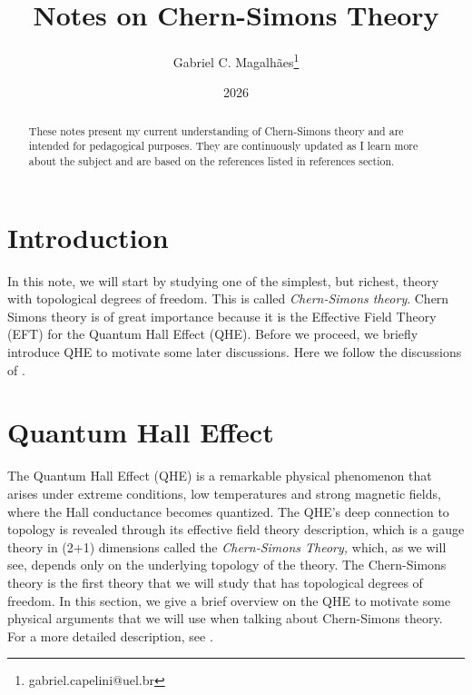 \documentclass{article}
\title{Notes on Chern-Simons Theory}
\author{Gabriel C. Magalhães\footnote{gabriel.capelini@uel.br}}
\date{2026}
\begin{document}
\maketitle

\begin{abstract}
	These notes present  my current understanding of Chern-Simons theory and are intended for pedagogical purposes. They are continuously updated as I learn more about the subject and are based on the references listed in references section.
\end{abstract}

\tableofcontents
\pagebreak

\section{Introduction}
 In this note, we will start by studying one of the simplest, but richest, theory with topological degrees of freedom. This is called \textit{Chern-Simons theory}. Chern Simons theory is of great importance because it is the Effective Field Theory (EFT) for the Quantum Hall Effect (QHE). Before we proceed, we briefly introduce QHE to motivate some later discussions. Here we follow the discussions of \cite{dunne_aspects_1999,tong_lectures_2016}.
\section{Quantum Hall Effect}
The Quantum Hall Effect (QHE) is a remarkable physical phenomenon that arises under extreme conditions, low temperatures and strong magnetic fields, where the Hall conductance becomes quantized. The QHE’s deep connection to topology is revealed through its effective field theory description, which is a gauge theory in (2+1) dimensions called the \textit{Chern-Simons Theory,} which, as we will see, depends only on the underlying topology of the theory. The Chern-Simons theory is the first theory that we will study that has topological degrees of freedom. In this section, we give a brief overview on the QHE to motivate some physical arguments that we will use when talking about Chern-Simons theory. For a more detailed description, see \cite{tong_lectures_2016}.
\end{document}
